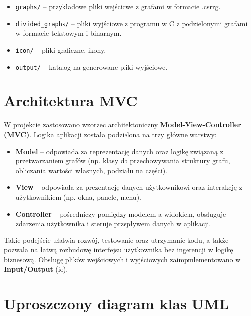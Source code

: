 \documentclass{article}
\begin{document}
\begin{itemize}
        \begin{itemize}
            \item \texttt{graphs/} -- przykładowe pliki wejściowe z grafami w formacie .csrrg.
            \item \texttt{divided\_graphs/} -- pliki wyjściowe z programu w C z podzielonymi grafami w formacie tekstowym i binarnym.
            \item \texttt{icon/} -- pliki graficzne, ikony.
            \item \texttt{output/} -- katalog na generowane pliki wyjściowe.
        \end{itemize}
    \end{itemize}



\section{Architektura MVC}

W projekcie zastosowano wzorzec architektoniczny \textbf{Model-View-Controller (MVC)}.  
Logika aplikacji została podzielona na trzy główne warstwy:

\begin{itemize}
    \item \textbf{Model} -- odpowiada za reprezentację danych oraz logikę związaną z przetwarzaniem grafów (np. klasy do przechowywania struktury grafu, obliczania wartości własnych, podziału na części).
    \item \textbf{View} -- odpowiada za prezentację danych użytkownikowi oraz interakcję z użytkownikiem (np. okna, panele, menu).
    \item \textbf{Controller} -- pośredniczy pomiędzy modelem a widokiem, obsługuje zdarzenia użytkownika i steruje przepływem danych w aplikacji.
\end{itemize}

Takie podejście ułatwia rozwój, testowanie oraz utrzymanie kodu, a także pozwala na łatwą rozbudowę interfejsu użytkownika bez ingerencji w logikę biznesową.
Obsługę plików wejściowych i wyjściowych zaimpmlementowano w \textbf{Input/Output} (io).



\section{Uproszczony diagram klas UML}
\end{document}
